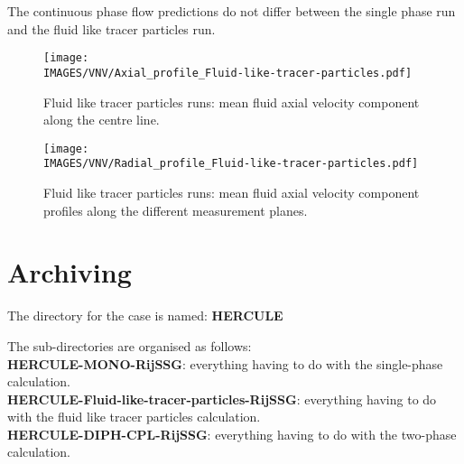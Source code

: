 \noindent

The continuous phase flow predictions do not differ between the single phase run and the fluid like tracer particles run.

\begin{figure}[H]
   \centerline{\texttt{[image: \\IMAGES/VNV/Axial\_profile\_Fluid-like-tracer-particles.pdf]}}
   \caption{Fluid like tracer particles runs: mean fluid axial velocity component along the centre line.}
   \label{AxeFluide_Fluid_like}
\end{figure}

\begin{figure}[H]
   \centerline{\texttt{[image: \\IMAGES/VNV/Radial\_profile\_Fluid-like-tracer-particles.pdf]}}
   \caption{Fluid like tracer particles runs: mean fluid axial velocity component profiles along the different measurement planes.}
   \label{ProfVZFluide_Fluid_like}
\end{figure}


\section{Archiving}

The directory for the case is named: \textbf{HERCULE}

The sub-directories are organised as follows:
\medskip\\
\hspace*{2cm}\textbf{HERCULE-MONO-RijSSG}: everything having to do with the single-phase calculation.
\medskip\\
\hspace*{2cm}\textbf{HERCULE-Fluid-like-tracer-particles-RijSSG}: everything having to do with the fluid like tracer particles calculation.
\medskip\\
\hspace*{2cm}\textbf{HERCULE-DIPH-CPL-RijSSG}: everything having to do with the two-phase calculation.



